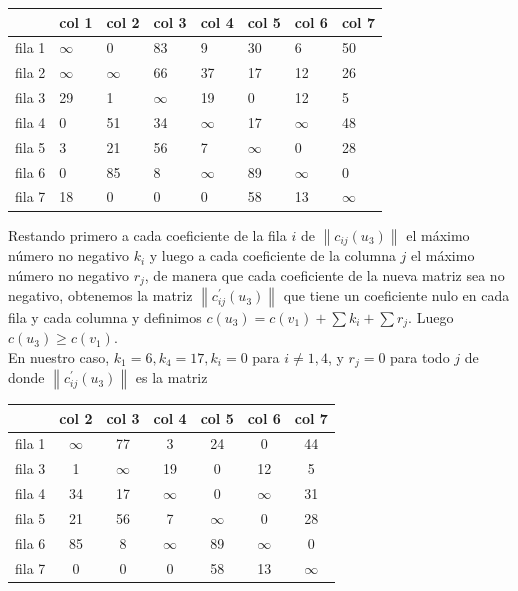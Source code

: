 \documentclass[10pt]{article}
\begin{document}
\begin{center}
\begin{tabular}{|l|l|l|l|l|l|l|l|}
\hline
 & col 1 & col 2 & col 3 & col 4 & col 5 & col 6 & col 7 \\
\hline
fila 1 & $\infty$ & 0 & 83 & 9 & 30 & 6 & 50 \\
\hline
fila 2 & $\infty$ & $\infty$ & 66 & 37 & 17 & 12 & 26 \\
\hline
fila 3 & 29 & 1 & $\infty$ & 19 & 0 & 12 & 5 \\
\hline
fila 4 & 0 & 51 & 34 & $\infty$ & 17 & $\infty$ & 48 \\
\hline
fila 5 & 3 & 21 & 56 & 7 & $\infty$ & 0 & 28 \\
\hline
fila 6 & 0 & 85 & 8 & $\infty$ & 89 & $\infty$ & 0 \\
\hline
fila 7 & 18 & 0 & 0 & 0 & 58 & 13 & $\infty$ \\
\hline
\end{tabular}
\end{center}

Restando primero a cada coeficiente de la fila $i$ de $\left\|c_{i j}\left(u_{3}\right)\right\|$ el máximo número no negativo $k_{i}$ y luego a cada coeficiente de la columna $j$ el máximo número no negativo $r_{j}$, de manera que cada coeficiente de la nueva matriz sea no negativo, obtenemos la matriz $\left\|c_{i j}^{\prime}\left(u_{3}\right)\right\|$ que tiene un coeficiente nulo en cada fila y cada columna y definimos $c\left(u_{3}\right)=c\left(v_{1}\right)+\sum k_{i}+\sum r_{j}$. Luego $c\left(u_{3}\right) \geq c\left(v_{1}\right)$.\\
En nuestro caso, $k_{1}=6, k_{4}=17, k_{i}=0$ para $i \neq 1,4$, y $r_{j}=0$ para todo $j$ de donde $\left\|c_{i j}^{\prime}\left(u_{3}\right)\right\|$ es la matriz

\begin{center}
\begin{tabular}{|c|c|c|c|c|c|c|}
\hline
 & col 2 & col 3 & col 4 & col 5 & col 6 & col 7 \\
\hline
fila 1 & $\infty$ & 77 & 3 & 24 & 0 & 44 \\
\hline
fila 3 & 1 & $\infty$ & 19 & 0 & 12 & 5 \\
\hline
fila 4 & 34 & 17 & $\infty$ & 0 & $\infty$ & 31 \\
\hline
fila 5 & 21 & 56 & 7 & $\infty$ & 0 & 28 \\
\hline
fila 6 & 85 & 8 & $\infty$ & 89 & $\infty$ & 0 \\
\hline
fila 7 & 0 & 0 & 0 & 58 & 13 & $\infty$ \\
\hline
\end{tabular}
\end{center}
\end{document}
